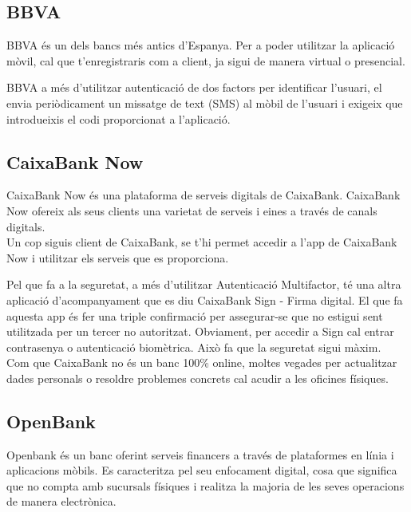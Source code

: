 
\subsection*{BBVA}

BBVA és un dels bancs més antics d'Espanya. Per a poder utilitzar la aplicació mòvil, cal que t'enregistraris com a client, ja sigui de manera virtual o presencial.

BBVA a més d'utilitzar autenticació de dos factors per identificar l'usuari, el envia periòdicament un missatge de text (SMS) al mòbil de l'usuari i exigeix que introdueixis el codi proporcionat a l'aplicació.



\subsection*{CaixaBank Now}

CaixaBank Now és una plataforma de serveis digitals de CaixaBank. CaixaBank Now ofereix als seus clients una varietat de serveis i eines a través de canals digitals.\\

Un cop siguis client de CaixaBank, se t'hi permet accedir a l'app de CaixaBank Now i utilitzar els serveis que es proporciona.

Pel que fa a la seguretat, a més d'utilitzar Autenticació Multifactor, té una altra aplicació d'acompanyament que es diu CaixaBank Sign - Firma digital. El que fa aquesta app és fer una triple confirmació per assegurar-se que no estigui sent utilitzada per un tercer no autoritzat. Obviament, per accedir a Sign cal entrar contrasenya o autenticació biomètrica. Això fa que la seguretat sigui màxim.\\

Com que CaixaBank no és un banc 100\% online, moltes vegades per actualitzar dades personals o resoldre problemes concrets cal acudir a les oficines físiques.


\subsection*{OpenBank}


Openbank és un banc oferint serveis financers a través de plataformes en línia i aplicacions mòbils. Es caracteritza pel seu enfocament digital, cosa que significa que no compta amb sucursals físiques i realitza la majoria de les seves operacions de manera electrònica. \\

